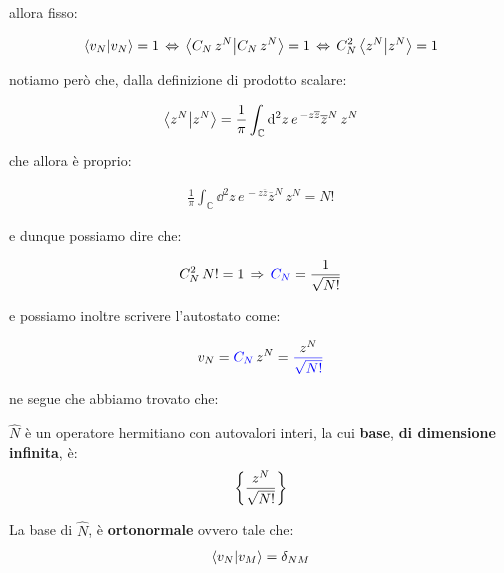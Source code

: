 	allora fisso:
	
\begin{align*}
	\braket{v_N} = 1 \, \Leftrightarrow \, \braket{C_N \, z^N }{C_N \, z^N } = 1 \, \Leftrightarrow \, C_N^2 \braket{z^N} = 1
\end{align*}

	notiamo però che, dalla definizione di prodotto scalare:
	
\begin{align*}
	\braket{z^N} = \frac{1}{\pi} \int_{\mathbb{C}} \dd^2z \, e^{\, -z\overline{z}} \overline{z}^N \, z^N
\end{align*}

	che allora è proprio:
	
\begin{align*}
	\frac{1}{\pi} \int_{\mathbb{C}} \dd^2z \, e^{\, -z\overline{z}} \overline{z}^N \, z^N = N!
\end{align*}

	e dunque possiamo dire che:
	
\begin{align*}
	C_N^2 \, N! = 1 \, \Rightarrow \, \textcolor{blue}{C_N} = \frac{1}{\sqrt{N!}}
\end{align*}

	e possiamo inoltre scrivere l'autostato come:

\begin{align*}
	v_N = \textcolor{blue}{C_N} \, z^N = \textcolor{blue}{\frac{\textcolor{black}{z^N}}{\sqrt{N!}}}
\end{align*}

	ne segue che abbiamo trovato che:
	
\begin{mydef}
	$\hat{N}$ è un operatore hermitiano con autovalori interi, la cui \textbf{base}, \textbf{di dimensione infinita}, è:
\begin{align*}
	\qty{\frac{z^N}{\sqrt{N!}}}
\end{align*}
\end{mydef}

\begin{myprop}
	La base di $\hat{N}$, è \textbf{ortonormale} ovvero tale che:
\begin{align*}
	\braket{v_N}{v_M} = \delta_{NM}
\end{align*}
\end{myprop}

